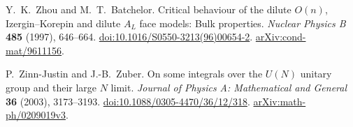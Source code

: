 Y.~K.~Zhou and M.~T.~Batchelor.
Critical behaviour of the dilute $O(n)$, Izergin--Korepin and dilute
$A_L$ face models: Bulk properties.
\emph{Nuclear Physics B} \textbf{485} (1997), 646--664.
\href{https://doi.org/10.1016/S0550-3213(96)00654-2}{doi:10.1016/S0550-3213(96)00654-2}.
\href{https://arxiv.org/abs/cond-mat/9611156}{arXiv:cond-mat/9611156}.

P.~Zinn-Justin and J.-B.~Zuber.
On some integrals over the $U(N)$ unitary group and their large $N$ limit.
\emph{Journal of Physics A: Mathematical and General}
\textbf{36} (2003), 3173--3193.
\href{https://doi.org/10.1088/0305-4470/36/12/318}{doi:10.1088/0305-4470/36/12/318}.
\href{https://arxiv.org/abs/math-ph/0209019v3}{arXiv:math-ph/0209019v3}.
